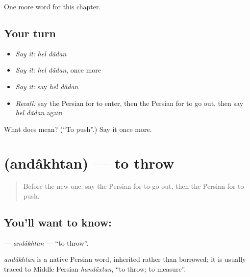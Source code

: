 \begin{grammarlens}[title={What you've built}]
One more word for this chapter.
\end{grammarlens}

\subsection*{Your turn}
\begin{itemize}
\raggedright
  \item \emph{Say it:} \emph{hel dâdan}
  \item \emph{Say it:} \emph{hel dâdan}, once more
  \item \emph{Say it:} say \emph{hel dâdan}
  \item \emph{Recall:} say the Persian for to enter, then the Persian for to go out, then say \emph{hel dâdan} again
\end{itemize}

\begin{tcolorbox}[breakable,colback=teal!4,colframe=teal!35!black,title={Before you move on}]
What does   mean? (\textquotedblleft{}To push\textquotedblright{}.) Say it once more.
\end{tcolorbox}
\section[\texorpdfstring{\fa{انداختن} (andâkhtan)}{انداختن (andâkhtan)}]{ (andâkhtan) — to throw}

\label{lesson:FA-C253-andakhtan}



\begin{quote}
Before the new one: say the Persian for to go out, then the Persian for to push.
\end{quote}

\subsection*{You'll want to know: }
\textbf{} — \emph{andâkhtan} — \textquotedblleft{}to throw\textquotedblright{}.

\begin{cousinweb}
\emph{andâkhtan} is a native Persian word, inherited rather than borrowed; it is usually traced to Middle Persian \emph{handāxtan}, \textquotedblleft{}to throw; to measure\textquotedblright{}.
\end{cousinweb}

